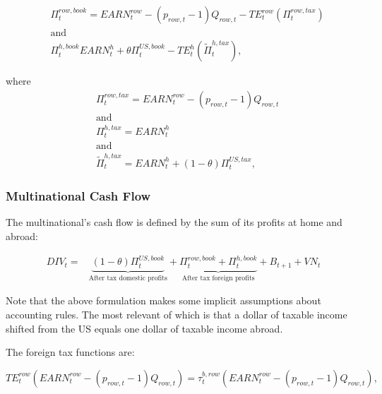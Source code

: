 \begin{equation}
\label{eqn:profit_book_mnc_row}
\begin{split}
&\Pi^{row,book}_{t} =EARN^{row}_{t} - (p_{row,t}-1)Q_{row,t} - TE^{row}_{t}(\Pi^{row, tax}_{t})\\
&\text{and} \\
&\Pi^{h,book}_{t} EARN^{h}_{t} +  \theta\Pi^{US,book}_{t} - TE^{h}_{t}(\tilde{\Pi}^{h, tax}_{t}),
\end{split}
\end{equation}

where
\begin{equation}
\label{eqn:profit_tax_mnc_row}
\begin{split}
&\Pi^{row, tax}_{t} = EARN^{row}_{t} - (p_{row,t}-1)Q_{row,t}\\
&\text{and} \\
&\Pi^{h, tax}_{t} = EARN^{h}_{t} \\
&\text{and} \\
&\tilde{\Pi}^{h, tax}_{t}=   EARN^{h}_{t} + (1-\theta)\Pi^{US,tax}_{t},
\end{split}
\end{equation}



\subsubsection{Multinational Cash Flow}

The multinational's cash flow is defined by the sum of its profits at home and abroad:


\begin{equation}
\label{eqn:cash_flow_mnc}
\begin{split}
DIV_{t} = &  \underbrace{(1-\theta)\Pi^{US,book}_{t}}_{\text{After tax domestic profits}} + \underbrace{\Pi^{row,book}_{t}  + \Pi^{h,book}_{t}}_{\text{After tax foreign profits}} + B_{t+1} + VN_{t}
\end{split}
\end{equation}

Note that the above formulation makes some implicit assumptions about accounting rules.  The most relevant of which is that a dollar of taxable income shifted from the US equals one dollar of taxable income abroad.

The foreign tax functions are:

\begin{equation}
\label{eqn:foreign_tax_row}
TE^{row}_{t}(EARN^{row}_{t}- (p_{row,t}-1)Q_{row,t}) = \tau^{b,row}_{t}(EARN^{row}_{t} -  (p_{row,t}-1)Q_{row,t}),
\end{equation}

